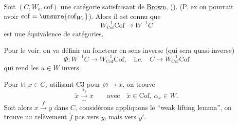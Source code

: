 Soit $(C,W_e,\mathrm{cof})$ une catégorie satisfaisant  de \uline{Brown}, ().
(P. ex on pourrait avoir $\mathrm{cof}=\unsure{\mathrm{cof}_{W_e}}$). Alors il est connu que
\[
W_{\mathrm{Cof}}^{-1}\mathrm{Cof}\longrightarrow W^{-1}C
\]
est une équivalence de catégories.

Pour le voir, on va définir un foncteur en sens inverse (qui sera quasi-inverse)
\[
\Phi:W^{-1}C\longrightarrow W_{\mathrm{Cof}}^{-1}\mathrm{Cof},\quad\text{i.e.}\quad C\longrightarrow W_{\mathrm{Cof}}^{-1}\mathrm{Cof}
\]
qui rend les $u\in W$ invers.

Pour tt $x\in C$, utilisant C3 pour $\varnothing\longrightarrow x$, on trouve
\[
\tilde x\xrightarrow[\sim]{\alpha_x}x\qquad\text{avec}\quad \tilde x\in\mathrm{Cof},\ \alpha_x\in W.
\]
Soit alors $x\xrightarrow{f}y$ dans $C$,
considérons
appliquons le ``weak lifting lemma'', on trouve
un relèvement $\tilde f$    pas vers $\tilde y$, mais vers $\tilde y'$.

